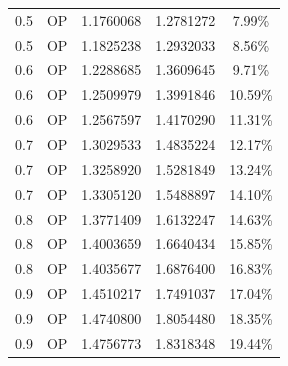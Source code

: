 \documentclass[12pt,a4paper,italian]{article}
\begin{document}
\begin{table}[ht!]
\begin{minipage}[b]{0.48\linewidth}
\begin{tabular}{c c c c c}
			 0.5 &  OP &  1.1760068 &    1.2781272    &  7.99\% \\	 
			 0.5 &  OP &  1.1825238 &    1.2932033    &  8.56\% \\	  \hline \hline 
			 0.6 &  OP &  1.2288685 &    1.3609645    &  9.71\% \\	 
			 0.6 &  OP &  1.2509979 &    1.3991846    &  10.59\% \\	 
			 0.6 &  OP &  1.2567597 &    1.4170290    &  11.31\% \\	  \hline \hline
			 0.7 &  OP &  1.3029533 &    1.4835224    &  12.17\% \\	 
			 0.7 &  OP &  1.3258920 &    1.5281849    &  13.24\% \\	 
			 0.7 &  OP &  1.3305120 &    1.5488897    &  14.10\% \\	  \hline \hline
			 0.8 &  OP &  1.3771409 &    1.6132247    &  14.63\% \\	 
			 0.8 &  OP &  1.4003659 &    1.6640434    &  15.85\% \\	 
			 0.8 &  OP &  1.4035677 &    1.6876400    &  16.83\% \\	  \hline \hline
			 0.9 &  OP &  1.4510217 &    1.7491037    &  17.04\% \\	 
			 0.9 &  OP &  1.4740800 &    1.8054480    &  18.35\% \\	 
			 0.9 &  OP &  1.4756773 &    1.8318348    &  19.44\% \\	  \hline
		\end{tabular}
		
	\end{minipage}
\end{table}
\ \ \ 
\end{document}
